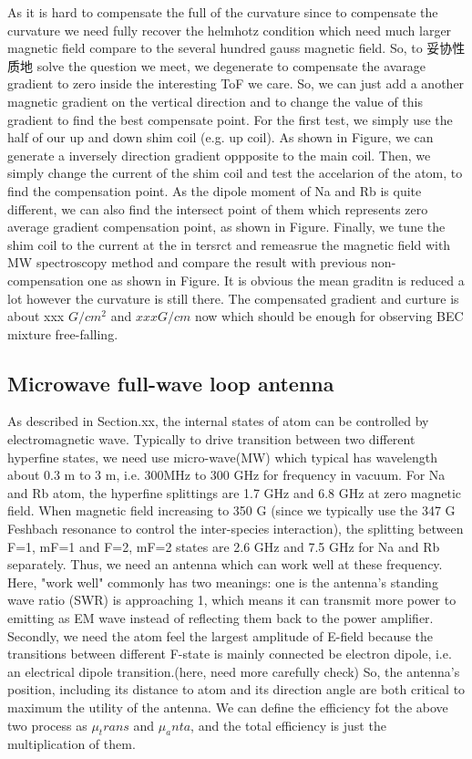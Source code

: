 As it is hard to compensate the full of the curvature since to compensate the curvature we need fully recover the helmhotz condition which need much larger magnetic field compare to the several hundred gauss magnetic field. So, to 妥协性质地 solve the question we meet, we degenerate to compensate the avarage gradient to zero inside the interesting ToF we care. So, we can just add a another magnetic gradient on the vertical direction and to change the value of this gradient to find the best compensate point. For the first test, we simply use the half of our up and down shim coil (e.g. up coil). As shown in Figure, we can generate a inversely direction gradient oppposite to the main coil. Then, we simply change the current of the shim coil and test the accelarion of the atom, to find the compensation point. As the dipole moment of Na and Rb is quite different, we can also find the intersect point of them which represents zero average gradient compensation point, as shown in Figure. Finally, we tune the shim coil to the current at the in tersrct and remeasrue the magnetic field with MW spectroscopy method and compare the result with previous non-compensation one as shown in Figure. It is obvious the mean graditn is reduced a lot however the curvature is still there. The compensated gradient and curture is about xxx \(G/cm^2\) and \(xxx G/cm\) now which should be enough for observing BEC mixture free-falling. 

\subsection{Microwave full-wave loop antenna}
\label{subsec:FWLA}
As described in Section.xx, the internal states of atom can be controlled by electromagnetic wave. Typically to drive transition between two different hyperfine states, we need use micro-wave(MW) which typical has wavelength about 0.3 m to 3 m, i.e. 300MHz to 300 GHz for frequency in vacuum. For Na and Rb atom, the hyperfine splittings are 1.7 GHz and 6.8 GHz at zero magnetic field. When magnetic field increasing to 350 G (since we typically use the 347 G Feshbach resonance to control the inter-species interaction), the splitting between F=1, mF=1 and F=2, mF=2 states are 2.6 GHz and 7.5 GHz for Na and Rb separately. Thus, we need an antenna which can work well at these frequency. Here, "work well" commonly has two meanings: one is the antenna's standing wave ratio (SWR) is approaching 1, which means it can transmit more power to emitting as EM wave instead of reflecting them back to the power amplifier. Secondly, we need the atom feel the largest amplitude of E-field because the transitions between different F-state is mainly connected be electron dipole, i.e. an electrical dipole transition.(here, need more carefully check) So, the antenna's position, including its distance to atom and its direction angle are both critical to maximum the utility of the antenna. We can define the efficiency fot the above two process as $\mu_trans$ and $\mu_anta$, and the total efficiency is just the multiplication of them.

